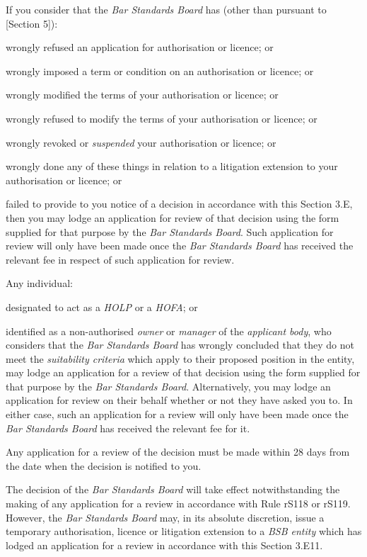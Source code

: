 If you consider that the \emph{Bar Standards Board} has (other than
pursuant to {[}Section 5{]}):\nl\item wrongly refused an application for authorisation or licence; or
\item wrongly imposed a term or condition on an authorisation or licence;
or
\item wrongly modified the terms of your authorisation or licence; or
\item wrongly refused to modify the terms of your authorisation or licence;
or
\item wrongly revoked or \emph{suspended} your authorisation or licence; or
\item wrongly done any of these things in relation to a litigation
extension to your authorisation or licence; or
\item failed to provide to you notice of a decision in accordance with this
Section 3.E, then you may lodge an application for review of that
decision using the form supplied for that purpose by the \emph{Bar
Standards Board}. Such application for review will only have been made
once the \emph{Bar Standards Board} has received the relevant fee in
respect of such application for review.
\ln
{}

Any individual:\nl\item designated to act as a \emph{HOLP} or a \emph{HOFA}; or
\item identified as a non-authorised \emph{owner} or \emph{manager} of the
\emph{applicant body},
\ln
who considers that the \emph{Bar Standards Board} has wrongly concluded
that they do not meet the \emph{suitability criteria} which apply to
their proposed position in the entity, may lodge an application for a
review of that decision using the form supplied for that purpose by the
\emph{Bar Standards Board}. Alternatively, you may lodge an application
for review on their behalf whether or not they have asked you to. In
either case, such an application for a review will only have been made
once the \emph{Bar Standards Board} has received the relevant fee for
it.


Any application for a review of the decision must be made within 28 days
from the date when the decision is notified to you.


The decision of the \emph{Bar Standards Board} will take effect
notwithstanding the making of any application for a review in accordance
with Rule rS118 or rS119. However, the \emph{Bar Standards Board} may,
in its absolute discretion, issue a temporary authorisation, licence or
litigation extension to a \emph{BSB entity} which has lodged an
application for a review in accordance with this Section 3.E11.

